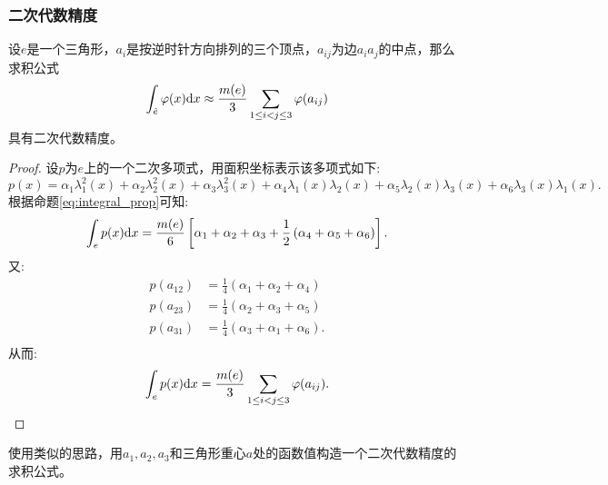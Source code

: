 \subsubsection{二次代数精度}
\begin{proposition}
    \label{prop:2order}
    设$e$是一个三角形，$a_{i}$是按逆时针方向排列的三个顶点，$a_{ij}$为边$a_{i}a_{j}$的中点，那么求积公式
    \begin{equation}
        \int_{\hat{e}}\varphi(x)\mathrm{d} x\approx\frac{m(e)}{3}\sum_{1\le i<j\le 3}\varphi(a_{ij})
    \end{equation}
    具有二次代数精度。
\end{proposition}
\begin{proof}
    设$p$为$e$上的一个二次多项式，用面积坐标表示该多项式如下:
    \begin{equation}
        p(x)=\alpha_{1}\lambda_{1}^{2}(x)+\alpha_{2}\lambda_{2}^{2}(x)+\alpha_{3}\lambda_{3}^{2}(x)+\alpha_{4}\lambda_{1}(x)\lambda_{2}(x)+\alpha_{5}\lambda_{2}(x)\lambda_{3}(x)+\alpha_{6}\lambda_{3}(x)\lambda_{1}(x).
    \end{equation}
    根据命题\ref{eq:integral_prop}可知:
    \begin{equation}
        \int_{e}p(x)\mathrm{d} x=\frac{m(e)}{6}\left[\alpha_{1}+\alpha_{2}+\alpha_{3}+\frac{1}{2}\left(\alpha_{4}+\alpha_{5}+\alpha_{6}\right)\right].
    \end{equation}
    又:
    \begin{equation}
        \begin{aligned}
            p(a_{12})&=\frac{1}{4}(\alpha_{1}+\alpha_{2}+\alpha_{4})\\
            p(a_{23})&=\frac{1}{4}(\alpha_{2}+\alpha_{3}+\alpha_{5})\\
            p(a_{31})&=\frac{1}{4}(\alpha_{3}+\alpha_{1}+\alpha_{6}).\\
        \end{aligned}
    \end{equation}
    从而:
    \begin{equation}
        \int_{e}p(x)\mathrm{d} x=\frac{m(e)}{3}\sum_{1\le i<j\le 3}\varphi(a_{ij}).
    \end{equation}
\end{proof}
\begin{exercise}
    使用类似的思路，用$a_{1},a_{2},a_{3}$和三角形重心$a$处的函数值构造一个二次代数精度的求积公式。
\end{exercise}
